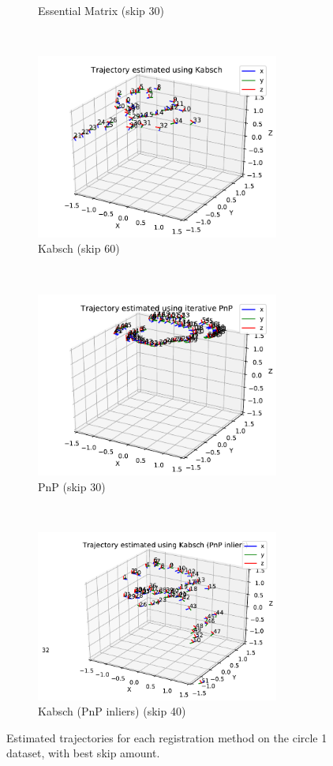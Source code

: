 \documentclass[12pt,a4paper]{article}
\begin{document}
\begin{figure}[p]
\begin{subfigure}[t]{0.5\textwidth}
        \caption{Essential Matrix (skip 30)}
      \end{subfigure} %
      ~
      \begin{subfigure}[t]{0.5\textwidth}
      \centering
        \includegraphics[width=80mm]{../quad/basic-reg-saves/60/atrj_d.pdf}
        \caption{Kabsch (skip 60)}
      \end{subfigure} 
      \\
      \begin{subfigure}[t]{0.5\textwidth}
        \includegraphics[width=80mm]{../quad/basic-reg-saves/30/atrj_pnp.pdf}
        \caption{PnP (skip 30)}
      \end{subfigure} %
      ~
      \begin{subfigure}[t]{0.5\textwidth}
      \centering
        \includegraphics[width=80mm]{../quad/basic-reg-saves/40/atrj_dp.pdf}
        \caption{Kabsch (PnP inliers) (skip 40)}
      \end{subfigure} 
      \caption{Estimated trajectories for each registration method on the circle 1 dataset, with best skip amount.}
      \label{f: quad3 trj}
    \end{figure}
\end{document}

